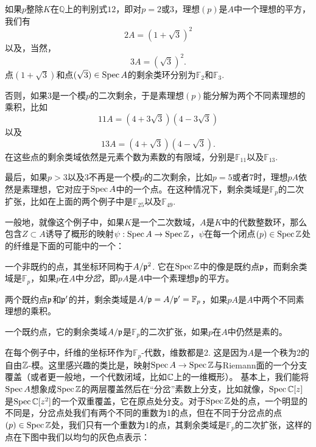 \begin{compactenum}[(1)]
	\item 如果$p$整除$K$在$\mathbb{Q}$上的判别式$12$，即对$p=2$或$3$，理想$(p)$是$A$中一个理想的平方，我们有
	\[
	2A=(1+\sqrt{3})^2
	\]
	以及，当然，
	\[
	3A=(\sqrt{3})^2.
	\]
	点$(1+\sqrt{3})$和点$(\sqrt{3})\in\operatorname{Spec} A$的剩余类环分别为$\mathbb{F}_2$和$\mathbb{F}_3$.

	\item 否则，如果$3$是一个模$p$的二次剩余，于是素理想$(p)$能分解为两个不同素理想的乘积，比如
	\[
	11A=(4+3\sqrt{3})(4-3\sqrt{3})
	\]
	以及
	\[
	13A=(4+\sqrt{3})(4-\sqrt{3}).
	\]
	在这些点的剩余类域依然是元素个数为素数的有限域，分别是$\mathbb{F}_{11}$以及$\mathbb{F}_{13}$.

	\item 最后，如果$p>3$以及$3$不再是一个模$p$的二次剩余，比如$p=5$或者$7$时，理想$pA$依然是素理想，它对应于$\operatorname{Spec} A$中的一个点。在这种情况下，剩余类域是$\mathbb{F}_p$的二次扩张，比如在上面的两个例子中是$\mathbb{F}_{25}$以及$\mathbb{F}_{49}$.
\end{compactenum}

一般地，就像这个例子中，如果$K$是一个二次数域，$A$是$K$中的代数整数环，那么包含$Z\subset A$诱导了概形的映射$\psi:\operatorname{Spec} A\to \operatorname{Spec} \mathbb{Z}$，$\psi$在每一个闭点$(p)\in \operatorname{Spec} \mathbb{Z}$处的纤维是下面的可能中的一个：

\begin{compactenum}[(1)]
	\item 一个非既约的点，其坐标环同构于$A/\mathfrak{p}^2$. 它在$\operatorname{Spec} \mathbb{Z}$中的像是既约点$\mathfrak{p}$，而剩余类域是$\mathbb{F}_p$，如果$p$在$A$中\textit{分岔}，即$pA$是$A$中一个素理想$\mathfrak{p}$的平方。

	\item 两个既约点$\mathfrak{p}$和$\mathfrak{p}'$的并，剩余类域是$A/\mathfrak{p}=A/\mathfrak{p}'=\mathbb{F}_p$，如果$pA$是$A$中两个不同素理想的乘积。

	\item 一个既约点，它的剩余类域$A/\mathfrak{p}$是$\mathbb{F}_p$的二次扩张，如果$p$在$A$中仍然是素的。
\end{compactenum}

在每个例子中，纤维的坐标环作为$\mathbb{F}_p$\hyp 代数，维数都是2. 这是因为$A$是一个秩为2的自由$\mathbb{Z}$\hyp 模。这里感兴趣的类比是，映射$\operatorname{Spec} A\to \operatorname{Spec} \mathbb{Z}$与Riemann面的一个分支覆盖（或者更一般地，一个代数闭域，比如$\mathbb{C}$上的一维概形）。 基本上，我们能将$\operatorname{Spec} A$想象成$\operatorname{Spec} \mathbb{Z}$的两层覆盖然后在“分岔”素数上分支，比如就像，$\operatorname{Spec} \mathbb{C}[z]$是$\operatorname{Spec} \mathbb{C}[z^2]$的一个双重覆盖，它在原点处分支。对于$\operatorname{Spec} \mathbb{Z}$处的点，一个明显的不同是，分岔点处我们有两个不同的重数为1的点，但在不同于分岔点的点$(p)\in \operatorname{Spec} \mathbb{Z}$处，我们只有一个重数为1的点，其剩余类域是$\mathbb{F}_p$的二次扩张，这样的点在下图中我们以均匀的灰色点表示：

